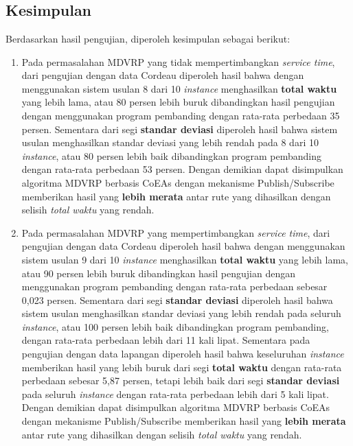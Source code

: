 \chapter{\kesimpulan}


\section{Kesimpulan}
Berdasarkan hasil pengujian, diperoleh kesimpulan sebagai berikut:

\begin{enumerate}
	\item Pada permasalahan MDVRP yang tidak mempertimbangkan \textit{service time}, dari pengujian dengan data Cordeau diperoleh hasil bahwa dengan menggunakan sistem usulan 8 dari 10 \textit{instance} menghasilkan \textbf{total waktu} yang lebih lama, atau 80 persen lebih buruk dibandingkan hasil pengujian dengan menggunakan program pembanding dengan rata-rata perbedaan 35 persen. Sementara dari segi \textbf{standar deviasi} diperoleh hasil bahwa sistem usulan menghasilkan standar deviasi yang lebih rendah pada 8 dari 10 \textit{instance}, atau 80 persen lebih baik dibandingkan program pembanding dengan rata-rata perbedaan 53 persen. Dengan demikian dapat disimpulkan algoritma MDVRP berbasis CoEAs dengan mekanisme Publish/Subscribe memberikan hasil yang \textbf{lebih merata} antar rute yang dihasilkan dengan selisih \textit{total waktu} yang rendah.
	
	\item Pada permasalahan MDVRP yang mempertimbangkan \textit{service time}, dari pengujian dengan data Cordeau diperoleh hasil bahwa dengan menggunakan sistem usulan 9 dari 10 \textit{instance} menghasilkan \textbf{total waktu} yang lebih lama, atau 90 persen lebih buruk dibandingkan hasil pengujian dengan menggunakan program pembanding dengan rata-rata perbedaan sebesar 0,023 persen. Sementara dari segi \textbf{standar deviasi} diperoleh hasil bahwa sistem usulan menghasilkan standar deviasi yang lebih rendah pada seluruh \textit{instance}, atau 100 persen lebih baik dibandingkan program pembanding, dengan rata-rata perbedaan lebih dari 11 kali lipat. Sementara pada pengujian dengan data lapangan diperoleh hasil bahwa keseluruhan \textit{instance} memberikan hasil yang lebih buruk dari segi \textbf{total waktu} dengan rata-rata perbedaan sebesar 5,87 persen, tetapi lebih baik dari segi \textbf{standar deviasi} pada seluruh \textit{instance} dengan rata-rata perbedaan lebih dari 5 kali lipat. Dengan demikian dapat disimpulkan algoritma MDVRP berbasis CoEAs dengan mekanisme Publish/Subscribe memberikan hasil yang \textbf{lebih merata} antar rute yang dihasilkan dengan selisih \textit{total waktu} yang rendah.
	

\end{enumerate}
